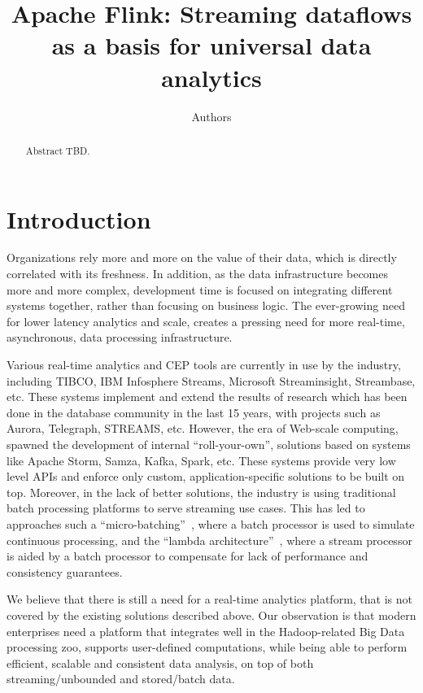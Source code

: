 \documentclass{sig-alternate}
\begin{document}
\title{Apache Flink\texttrademark : Streaming dataflows as a basis for universal data analytics}
\author{Authors}

\maketitle

\begin{abstract}
Abstract TBD.
\end{abstract}


\section{Introduction}

Organizations rely more and more on the value of their data, which is directly correlated with its freshness. In addition, as the data infrastructure becomes more and more complex, development time is focused on integrating different systems together, rather than focusing on business logic. The ever-growing need for lower latency analytics and scale, creates a pressing need for more real-time, asynchronous, data processing infrastructure.

Various real-time analytics and CEP tools are currently in use by the industry, including TIBCO, IBM Infosphere Streams, Microsoft Streaminsight, Streambase, etc. These systems implement and extend the results of research which has been done in the database community in the last 15 years, with projects such as Aurora, Telegraph, STREAMS, etc. However, the era of Web-scale computing, spawned the development of internal ``roll-your-own'', solutions based on systems like Apache Storm, Samza, Kafka, Spark, etc. These systems provide very low level APIs and enforce only custom, application-specific solutions to be built on top.  Moreover, in the lack of better solutions, the industry is using traditional batch processing platforms to serve streaming use cases. This has led to approaches such a ``micro-batching''~\cite{Zaharia:2013:DSF:2517349.2522737}, where a batch processor is used to simulate continuous processing, and the ``lambda architecture''~\cite{marz2015big}, where a stream processor is aided by a batch processor to compensate for lack of performance and consistency guarantees.

We believe that there is still a need for a real-time analytics platform, that is not covered by the existing solutions described above. Our observation is that modern enterprises need a platform that integrates well in the Hadoop-related Big Data processing zoo, supports user-defined computations, while being able to perform efficient, scalable and consistent data analysis, on top of both streaming/unbounded and stored/batch data.
\end{document}
